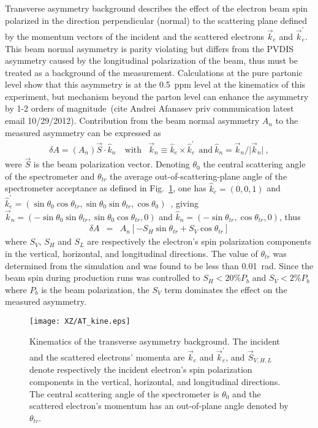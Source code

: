 Transverse asymmetry background describes the effect of the electron beam spin polarized in the direction
perpendicular (normal) to the scattering plane defined by the momentum vectors of the incident and the scattered 
electrons $\vec k_e$ and $\vec k_e^\prime$. 
This beam normal asymmetry is parity violating but differs from the PVDIS asymmetry caused
by the longitudinal polarization of the beam, thus must be treated as a background of the measurement.
Calculations at the pure partonic level show that this asymmetry is at the 0.5~ppm level at the kinematics
of this experiment, but mechanism 
beyond the parton level can enhance the asymmetry by 1-2 orders of magnitude~(cite Andrei Afanasev priv communication
latest email 10/29/2012). Contribution from the beam normal asymmetry $A_n$ to the measured asymmetry 
can be expressed as
\begin{eqnarray}
  \delta A = (A_n) \vec S\cdot \hat k_n~&\mathrm{with}&\vec k_n\equiv \hat k_e\times \hat k_e^\prime~~\mathrm{and}~
\hat k_n=\vec k_n/\vert\vec k_n\vert~,
\end{eqnarray}
were $\vec S$ is the beam polarization vector.
Denoting $\theta_0$ the central scattering angle of the spectrometer and $\theta_{tr}$ the average
out-of-scattering-plane angle of the spectrometer acceptance as defined in Fig.~\ref{fig:ATkine}, 
one has $\hat k_e=(0,0,1)$ and 
$\hat k_e^\prime = (\sin\theta_0\cos\theta_{tr}, \sin\theta_0\sin\theta_{tr},\cos\theta_0)$~, 
giving $\vec k_n=(-\sin\theta_0\sin\theta_{tr},\sin\theta_0\cos\theta_{tr},0)$
and $\hat k_n = (-\sin\theta_{tr},\cos\theta_{tr},0)$, thus
\begin{eqnarray}
 \delta A &=& {A_n}\left[-S_H\sin\theta_{tr}+S_V\cos\theta_{tr}\right]
\end{eqnarray}
where $S_V$, $S_H$ and $S_L$ are respectively the electron's spin polarization components in the vertical,
horizontal, and longitudinal directions. The value of $\theta_{tr}$ was determined
from the simulation and was found to be less than 0.01~rad. Since the beam spin during production
runs was controlled to $S_H<20\% P_b$ and $S_V<2\% P_b$ where $P_b$ is the beam polarization,  
the $S_V$ term dominates the effect on the measured asymmetry.

\begin{figure}
 \caption{Kinematics of the transverse asymmetry background. The incident and the scattered electrons'
momenta are $\vec k_e$ and $\vec k_e^\prime$, and $\vec S_{V,H,L}$ denote respectively 
the incident electron's spin polarization
components in the vertical, horizontal, and longitudinal directions. 
The central scattering angle of the spectrometer is $\theta_0$ and the scattered electron's momentum
has an out-of-plane angle denoted by $\theta_{tr}$.}\label{fig:ATkine}
 \begin{center} 
  \texttt{[image: XZ/AT\_kine.eps]}
 \end{center}
\end{figure}


